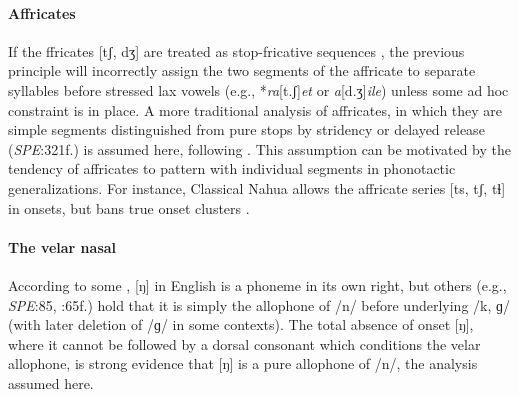 \paragraph{Affricates} If the ffricates [tʃ, dʒ] are treated as stop-fricative sequences \citep[e.g.,][]{Hualde1988,Lombardi1990}, the previous principle will incorrectly assign the two segments of the affricate to separate syllables before stressed lax vowels (e.g., *\emph{ra}[t.ʃ]\emph{et} or \emph{a}[d.ʒ]\emph{ile}) unless some ad hoc constraint \citep[e.g.,][]{Wells1990} is in place. A more traditional analysis of affricates, in which they are simple segments distinguished from pure stops by stridency \citep[24]{Jakobson1961} or delayed release (\emph{SPE}:321f.) is assumed here, following \citeauthor{Pierrehumbert1994}. This assumption can be motivated by the tendency of affricates to pattern with individual segments in phonotactic generalizations. For instance, Classical Nahua allows the affricate series [ts, tʃ, tɬ] in onsets, but bans true onset clusters \citep[9]{Launey2011}.

\paragraph{The velar nasal} According to some \citep[e.g.,][]{Sapir1925}, [ŋ] in English is a phoneme in its own right, but others (e.g., \emph{SPE}:85, \citealp{Borowsky1986}:65f.) hold that it is simply the allophone of /n/ before underlying /k, ɡ/ (with later deletion of /ɡ/ in some contexts). The total absence of onset [ŋ], where it cannot be followed by a dorsal consonant which conditions the velar allophone, is strong evidence that [ŋ] is a pure allophone of /n/, the analysis assumed here.

